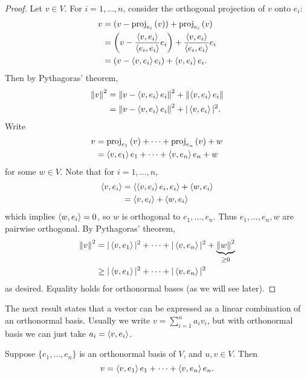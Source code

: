 \begin{proof}
Let $v\in V$. For $i=1,\dots,n$, consider the orthogonal projection of $v$ onto $e_i$:
\begin{align*}
v&=(v-\mathrm{proj}_{e_i}\left({v}\right))+\mathrm{proj}_{e_i}\left({v}\right)\\
&=\left(v-\frac{\left\langle v,e_i\right\rangle}{\left\langle e_i,e_i\right\rangle}e_i\right)+\frac{\left\langle v,e_i\right\rangle}{\left\langle e_i,e_i\right\rangle}e_i\\
&=\left(v-\left\langle v,e_i\right\rangle e_i\right)+\left\langle v,e_i\right\rangle e_i.
\end{align*}
Then by Pythagoras' theorem,
\begin{align*}
\norm{v}^2
&=\norm{v-\left\langle v,e_i\right\rangle e_i}^2+\norm{\left\langle v,e_i\right\rangle e_i}\\
&=\norm{v-\left\langle v,e_i\right\rangle e_i}^2+|\left\langle v,e_i\right\rangle|^2.
\end{align*}
Write
\begin{align*}
v&=\mathrm{proj}_{e_1}\left({v}\right)+\cdots+\mathrm{proj}_{e_n}\left({v}\right)+w\\
&=\left\langle v,e_1\right\rangle e_1+\cdots+\left\langle v,e_n\right\rangle e_n+w
\end{align*}
for some $w\in V$. Note that for $i=1,\dots,n$,
\begin{align*}
\left\langle v,e_i\right\rangle
&=\left\langle\left\langle v,e_i\right\rangle e_i,e_i\right\rangle+\left\langle w,e_i\right\rangle\\
&=\left\langle v,e_i\right\rangle+\left\langle w,e_i\right\rangle
\end{align*}
which implies $\left\langle w,e_i\right\rangle=0$, so $w$ is orthogonal to $e_1,\dots,e_n$. Thus $e_1,\dots,e_n,w$ are pairwise orthogonal. By Pythagoras' theorem,
\begin{align*}
\norm{v}^2
&=|\left\langle v,e_1\right\rangle|^2+\cdots+|\left\langle v,e_n\right\rangle|^2+\underbrace{\norm{w}^2}_{\ge0}\\
&\ge|\left\langle v,e_1\right\rangle|^2+\cdots+|\left\langle v,e_n\right\rangle|^2
\end{align*}
as desired. Equality holds for orthonormal bases (as we will see later).
\end{proof}

The next result states that a vector can be expressed as a linear combination of an orthonormal basis. Usually we write $v=\sum_{i=1}^{n}a_iv_i$, but with orthonormal basis we can just take $a_i=\left\langle v,e_i\right\rangle$.

\begin{lemma}\label{lemma:orthonormal-basis-linear-combination}
Suppose $\{e_1,\dots,e_n\}$ is an orthonormal basis of $V$, and $u,v\in V$. Then
\begin{equation}\label{eqn:orthonormal-basis-linear-combination}
v=\left\langle v,e_1\right\rangle e_1+\cdots+\left\langle v,e_n\right\rangle e_n.
\end{equation}
\end{lemma}

